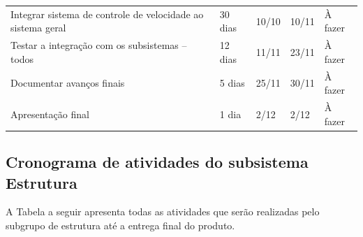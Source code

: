 \begin{table}[!htbp]
{\begin{tabular}{ l l l l l }
    \multicolumn{1}{|p{6.367cm}|}{Integrar sistema de controle de velocidade ao sistema geral} &
    \multicolumn{1}{p{1.750cm}|}{30 dias} &
    \multicolumn{1}{p{1.267cm}|}{10/10} &
    \multicolumn{1}{p{1.233cm}|}{10/11} &
    \multicolumn{1}{p{1.917cm}|}{À fazer}
  \\  
  \cline{1-1}\cline{2-2}\cline{3-3}\cline{4-4}\cline{5-5}  
    \multicolumn{1}{|p{6.367cm}|}{Testar a integração com os subsistemas – todos} &
    \multicolumn{1}{p{1.750cm}|}{12 dias} &
    \multicolumn{1}{p{1.267cm}|}{11/11} &
    \multicolumn{1}{p{1.233cm}|}{23/11} &
    \multicolumn{1}{p{1.917cm}|}{À fazer}
  \\  
  \cline{1-1}\cline{2-2}\cline{3-3}\cline{4-4}\cline{5-5}  
    \multicolumn{1}{|p{6.367cm}|}{Documentar avanços finais} &
    \multicolumn{1}{p{1.750cm}|}{5 dias} &
    \multicolumn{1}{p{1.267cm}|}{25/11} &
    \multicolumn{1}{p{1.233cm}|}{30/11} &
    \multicolumn{1}{p{1.917cm}|}{À fazer}
  \\  
  \cline{1-1}\cline{2-2}\cline{3-3}\cline{4-4}\cline{5-5}  
    \multicolumn{1}{|p{6.367cm}|}{Apresentação final} &
    \multicolumn{1}{p{1.750cm}|}{1 dia} &
    \multicolumn{1}{p{1.267cm}|}{2/12} &
    \multicolumn{1}{p{1.233cm}|}{2/12} &
    \multicolumn{1}{p{1.917cm}|}{À fazer}
  \\  
  \hline

 \end{tabular} }
\end{table}

\newpage

\subsection{Cronograma de atividades do subsistema Estrutura}

A Tabela a seguir apresenta todas as atividades que serão realizadas pelo subgrupo de estrutura até a entrega final do produto.

